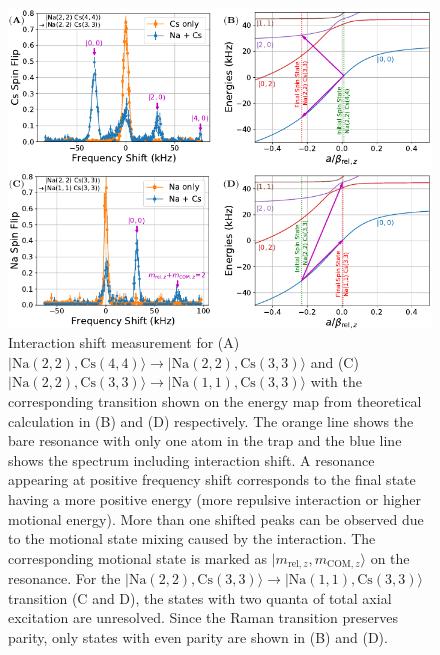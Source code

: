 \begin{figure}
  \centering
  \includegraphics[width=\textwidth]{figures/interaction_shift_results.pdf}
  \caption[Interaction shift measurement results.]{
    Interaction shift measurement for
    (A) $|\mathrm{Na(2, 2),Cs(4, 4)}\rangle\rightarrow|\mathrm{Na(2, 2),Cs(3, 3)}\rangle$
    and (C) $|\mathrm{Na(2, 2),Cs(3, 3)}\rangle\rightarrow|\mathrm{Na(1, 1),Cs(3, 3)}\rangle$
    with the corresponding transition shown on the energy map from theoretical calculation
    in (B) and (D) respectively.
    The orange line shows the bare resonance with only one atom in the trap
    and the blue line shows the spectrum including interaction shift.
    A resonance appearing at positive frequency shift corresponds to the final state
    having a more positive energy (more repulsive interaction or higher motional energy).
    More than one shifted peaks can be observed due to the motional state mixing caused
    by the interaction. The corresponding motional state is marked as
    $|m_{\mathrm{rel},z},m_{\mathrm{COM},z}\rangle$ on the resonance.
    For the $|\mathrm{Na(2, 2),Cs(3, 3)}\rangle\rightarrow|\mathrm{Na(1, 1),Cs(3, 3)}\rangle$
    transition (C and D), the states with two quanta of total axial excitation are unresolved.
    Since the Raman transition preserves parity, only states with even parity are shown
    in (B) and (D).
    \label{fig:interaction-shift:results}}
\end{figure}

